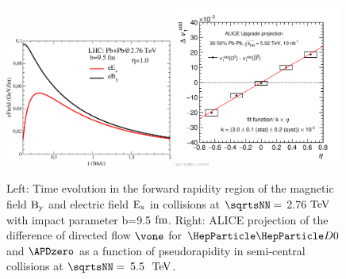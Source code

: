 \begin{figure}
\centering
\includegraphics[width=0.49\textwidth]{hf/figures/EMfield_evolution.pdf}
\includegraphics[width=0.49\textwidth]{hf/figures/2017-Oct-26-ALiceProjDeltav1Dzero.pdf}
\caption{Left: Time evolution in the forward rapidity region of the magnetic field $\rm B_{y}$ and electric field $\rm E_{x}$ in \PbPb collisions at $\sqrtsNN=$ 2.76$~\text{TeV}$ with impact parameter b=9.5$~\text{fm}$. Right: ALICE projection of the difference of directed flow $\vone$ for $\PDz$ and $\APDzero$ as a function of pseudorapidity in semi-central \PbPb collisions at $\sqrtsNN=$ 5.5 $~\text{TeV}$.}
\label{fig:v1}
\end {figure}






